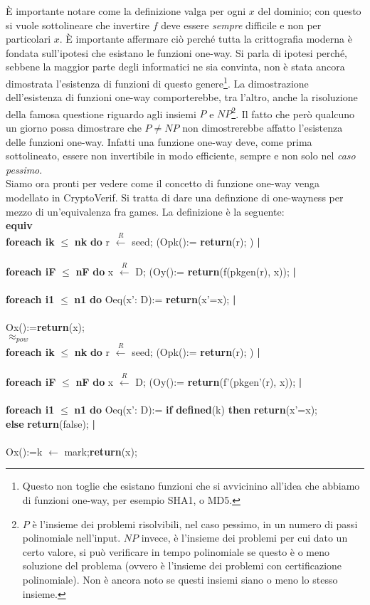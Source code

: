 \documentclass[a4paper,openright,twoside,12pt]{report}
\newcommand{\foreach}[2]{\textbf{foreach #1} $\leq$ \textbf{#2} \textbf{do}}
\newcommand{\return}[1]{\textbf{return}(#1);}
\newcommand{\pipe}{ \textbf{|} \\ \\}
\newcommand{\setR}[2]{#1 $\xleftarrow{R}$ #2;}
\newcommand{\set}[2]{#1 $\leftarrow$ #2;}
\newcommand{\ifthen}[2]{\textbf{if} #1 \textbf{then} #2}
\newcommand{\equiva}{\textbf{equiv}}
\begin{document}
\`E importante notare come la definizione valga per ogni $x$ del dominio; con questo si vuole sottolineare che invertire $f$ deve essere \emph{sempre} difficile e non per particolari $x$.
\`E importante affermare ci\`o perch\'e tutta la crittografia moderna \`e fondata sull'ipotesi che esistano le funzioni one-way.
Si parla di ipotesi perch\'e, sebbene la maggior parte degli informatici ne sia convinta, non \`e stata ancora dimostrata l'esistenza di funzioni di questo genere\footnote{Questo non toglie
che esistano funzioni che si avvicinino all'idea che abbiamo di funzioni one-way, per esempio SHA1, o MD5.}.
La dimostrazione dell'esistenza di funzioni one-way comporterebbe, tra l'altro, anche la risoluzione della famosa questione riguardo agli insiemi
$P$ e $NP$\footnote{$P$ \`e l'insieme dei problemi risolvibili, nel caso pessimo, in un numero di passi polinomiale nell'input. $NP$ invece, \`e l'insieme dei problemi per cui dato un certo valore, 
si pu\`o verificare in tempo polinomiale se questo \`e o meno soluzione del problema (ovvero \`e l'insieme dei problemi con certificazione polinomiale). 
Non \`e ancora noto se questi insiemi siano o meno lo stesso insieme.}.
Il fatto che però qualcuno un giorno possa dimostrare che $P \neq NP$ non dimostrerebbe affatto l'esistenza delle funzioni one-way. 
Infatti una funzione one-way deve, come prima sottolineato, essere non invertibile in modo efficiente, sempre e non solo nel \emph{caso pessimo}. \\ 
Siamo ora pronti per vedere come il concetto di funzione one-way venga modellato in CryptoVerif.
Si tratta di dare una definzione di one-wayness per mezzo di un'equivalenza fra games. La definizione \`e la seguente:\\
\equiva \\
\foreach{ik}{nk} \setR{r}{seed} (Opk():= \return{r} )\pipe 
 \foreach{iF}{nF} \setR{x}{D} (Oy():= \return{f(pkgen(r), x)} \pipe
  \foreach{i1}{n1} Oeq(x': D):= \return{x'=x} \pipe 
    Ox():=\return{x} \\
\textbf{$\approx _{pow}$}\\
\foreach{ik}{nk} \setR{r}{seed} (Opk():= \return{r} )\pipe 
 \foreach{iF}{nF} \setR{x}{D} (Oy():= \return{f'(pkgen'(r), x)} \pipe
  \foreach{i1}{n1} Oeq(x': D):= \ifthen{\textbf{defined}(k)}{\return{x'=x}} \\ \textbf{else}  \return{false} \pipe 
    Ox():=\set{k}{mark}\return{x} \\
\end{document}

